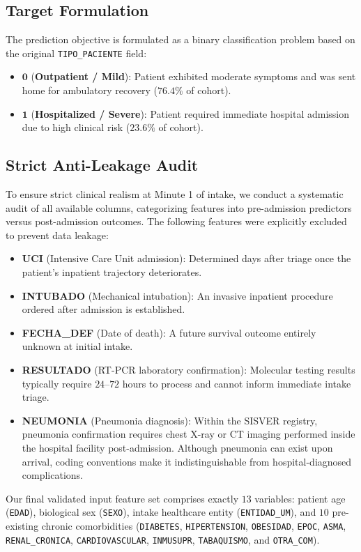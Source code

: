\documentclass{article}
\begin{document}
\subsection{Target Formulation}
The prediction objective is formulated as a binary classification problem based on the original \texttt{TIPO\_PACIENTE} field:
\begin{itemize}
    \item $\textbf{0}$ (\textbf{Outpatient / Mild}): Patient exhibited moderate symptoms and was sent home for ambulatory recovery ($76.4\%$ of cohort).
    \item $\textbf{1}$ (\textbf{Hospitalized / Severe}): Patient required immediate hospital admission due to high clinical risk ($23.6\%$ of cohort).
\end{itemize}

\subsection{Strict Anti-Leakage Audit}
To ensure strict clinical realism at Minute 1 of intake, we conduct a systematic audit of all available columns, categorizing features into pre-admission predictors versus post-admission outcomes. The following features were explicitly excluded to prevent data leakage:
\begin{itemize}
    \item \textbf{UCI} (Intensive Care Unit admission): Determined days after triage once the patient's inpatient trajectory deteriorates.
    \item \textbf{INTUBADO} (Mechanical intubation): An invasive inpatient procedure ordered after admission is established.
    \item \textbf{FECHA\_DEF} (Date of death): A future survival outcome entirely unknown at initial intake.
    \item \textbf{RESULTADO} (RT-PCR laboratory confirmation): Molecular testing results typically require $24\text{--}72$ hours to process and cannot inform immediate intake triage.
    \item \textbf{NEUMONIA} (Pneumonia diagnosis): Within the SISVER registry, pneumonia confirmation requires chest X-ray or CT imaging performed inside the hospital facility post-admission. Although pneumonia can exist upon arrival, coding conventions make it indistinguishable from hospital-diagnosed complications.
\end{itemize}

Our final validated input feature set comprises exactly $13$ variables: patient age (\texttt{EDAD}), biological sex (\texttt{SEXO}), intake healthcare entity (\texttt{ENTIDAD\_UM}), and $10$ pre-existing chronic comorbidities (\texttt{DIABETES}, \texttt{HIPERTENSION}, \texttt{OBESIDAD}, \texttt{EPOC}, \texttt{ASMA}, \texttt{RENAL\_CRONICA}, \texttt{CARDIOVASCULAR}, \texttt{INMUSUPR}, \texttt{TABAQUISMO}, and \texttt{OTRA\_COM}).
\end{document}
